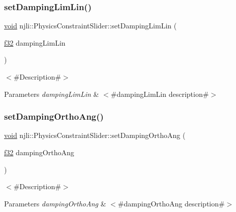 \subsubsection{\texorpdfstring{set\+Damping\+Lim\+Lin()}{setDampingLimLin()}}
{\footnotesize\ttfamily \mbox{\hyperlink{_thread_8h_af1e856da2e658414cb2456cb6f7ebc66}{void}} njli\+::\+Physics\+Constraint\+Slider\+::set\+Damping\+Lim\+Lin (\begin{DoxyParamCaption}\item[{\mbox{\hyperlink{_util_8h_a5f6906312a689f27d70e9d086649d3fd}{f32}}}]{damping\+Lim\+Lin }\end{DoxyParamCaption})}

$<$\#\+Description\#$>$


\begin{DoxyParams}{Parameters}
{\em damping\+Lim\+Lin} & $<$\#damping\+Lim\+Lin description\#$>$ \\
\hline
\end{DoxyParams}
\mbox{\label{classnjli_1_1_physics_constraint_slider_a08c148b76585f4d2abe9f8569db6e311}} 
\subsubsection{\texorpdfstring{set\+Damping\+Ortho\+Ang()}{setDampingOrthoAng()}}
{\footnotesize\ttfamily \mbox{\hyperlink{_thread_8h_af1e856da2e658414cb2456cb6f7ebc66}{void}} njli\+::\+Physics\+Constraint\+Slider\+::set\+Damping\+Ortho\+Ang (\begin{DoxyParamCaption}\item[{\mbox{\hyperlink{_util_8h_a5f6906312a689f27d70e9d086649d3fd}{f32}}}]{damping\+Ortho\+Ang }\end{DoxyParamCaption})}

$<$\#\+Description\#$>$


\begin{DoxyParams}{Parameters}
{\em damping\+Ortho\+Ang} & $<$\#damping\+Ortho\+Ang description\#$>$ \\
\hline
\end{DoxyParams}
\mbox{\label{classnjli_1_1_physics_constraint_slider_acd555aededdf9800e83c513603005a40}} 
